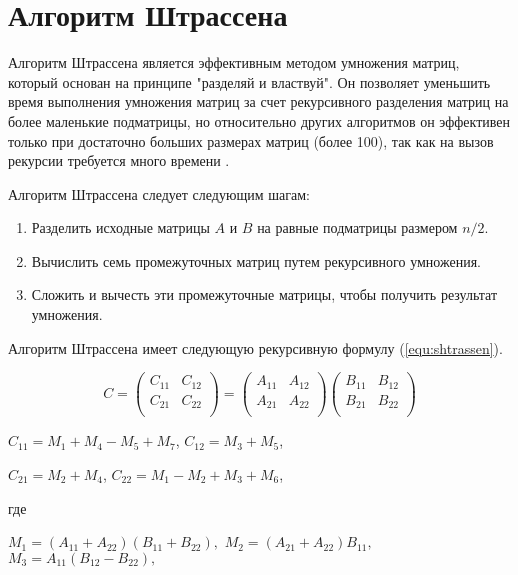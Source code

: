 \section{Алгоритм Штрассена}
Алгоритм Штрассена является эффективным методом умножения матриц, который основан на принципе "разделяй и властвуй". Он позволяет уменьшить время выполнения умножения матриц за счет рекурсивного разделения матриц на более маленькие подматрицы, но относительно других алгоритмов он эффективен только при достаточно больших размерах матриц (более 100), так как на вызов рекурсии требуется много времени \cite{book_shtrassen}.

Алгоритм Штрассена следует следующим шагам:
\begin{enumerate}[label=\arabic*)]
	\item Разделить исходные матрицы $A$ и $B$ на равные подматрицы размером $n/2$.
	\item Вычислить семь промежуточных матриц путем рекурсивного умножения.
	\item Сложить и вычесть эти промежуточные матрицы, чтобы получить результат умножения.
\end{enumerate}

Алгоритм Штрассена имеет следующую рекурсивную формулу (\ref{equ:shtrassen}).


\begin{equation}
	\label{equ:shtrassen}
	C = \begin{pmatrix}
		C_{11} & C_{12} \\
		C_{21} & C_{22} \\
	\end{pmatrix} = \begin{pmatrix}
		A_{11} & A_{12} \\
		A_{21} & A_{22} \\
	\end{pmatrix}
	\begin{pmatrix}
		B_{11} & B_{12} \\
		B_{21} & B_{22} \\
	\end{pmatrix}
\end{equation}

$C_{11} = M_1 + M_4 - M_5 + M_7$, $C_{12} = M_3 + M_5$, 

$C_{21} = M_2 + M_4$, $C_{22} = M_1 - M_2 + M_3 + M_6$,

где

$M_1 = (A_{11} + A_{22})(B_{11} + B_{22}),$
$M_2 = (A_{21} + A_{22})B_{11},$
$M_3 = A_{11}(B_{12} - B_{22}),$

